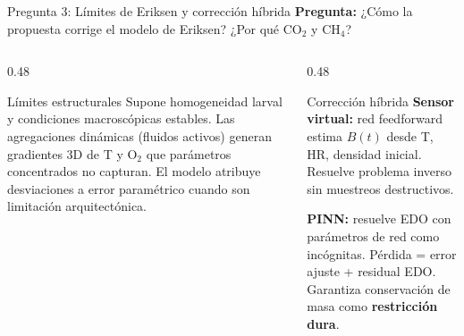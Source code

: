 \documentclass[aspectratio=169, 11pt]{beamer}
\begin{document}
\begin{frame}{Pregunta 3: Límites de Eriksen y corrección híbrida}
\textbf{Pregunta:} ¿Cómo la propuesta corrige el modelo de Eriksen? ¿Por qué CO$_2$ y CH$_4$?

\vspace{0.3cm}
\begin{columns}[T]
\begin{column}{0.48\textwidth}
\begin{block}{Límites estructurales}
\footnotesize
Supone homogeneidad larval y condiciones macroscópicas estables. Las agregaciones dinámicas (fluidos activos) generan gradientes 3D de T y O$_2$ que parámetros concentrados no capturan. El modelo atribuye desviaciones a error paramétrico cuando son limitación arquitectónica.
\end{block}
\end{column}
\begin{column}{0.48\textwidth}
\begin{exampleblock}{Corrección híbrida}
\footnotesize
\textbf{Sensor virtual:} red feedforward estima $B(t)$ desde T, HR, densidad inicial. Resuelve problema inverso sin muestreos destructivos.

\textbf{PINN:} resuelve EDO con parámetros de red como incógnitas. Pérdida = error ajuste + residual EDO. Garantiza conservación de masa como \textbf{restricción dura}.
\end{exampleblock}
\end{column}
\end{columns}
\end{frame}
\end{document}
